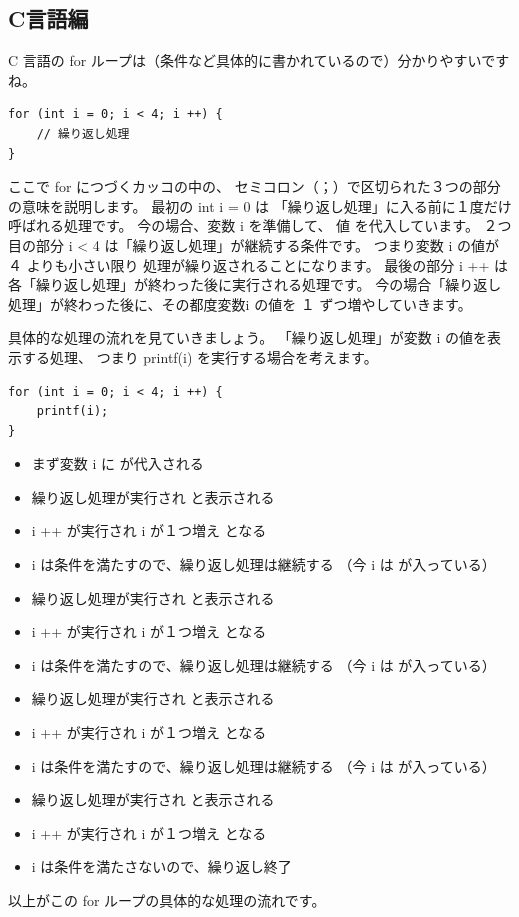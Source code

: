 \documentclass[dvipdfmx,autodetect-engine,10pt,b5paper,papersize,openany,dvipsnames]{jsbook}
\begin{document}
\begin{multicols}{2}
\section*{C言語編}
C 言語の for ループは（条件など具体的に書かれているので）分かりやすいですね。
\begin{lstlisting}
for (int i = 0; i < 4; i ++) {
    // 繰り返し処理
}
\end{lstlisting}
\noindent
ここで {\ttfamily for} につづくカッコの中の、
セミコロン（；）で区切られた３つの部分の意味を説明します。
最初の {\ttfamily int i = 0} は
「繰り返し処理」に入る前に１度だけ呼ばれる処理です。
今の場合、変数 {\ttfamily i} を準備して、
値 {} を代入しています。
２つ目の部分 {\ttfamily i < 4} は「繰り返し処理」が継続する条件です。
つまり変数 {\ttfamily i} の値が {\ttfamily ４} よりも小さい限り
処理が繰り返されることになります。
最後の部分 {\ttfamily i ++} は各「繰り返し処理」が終わった後に実行される処理です。
今の場合「繰り返し処理」が終わった後に、その都度変数{\ttfamily i}
の値を {\ttfamily １} ずつ増やしていきます。


具体的な処理の流れを見ていきましょう。
「繰り返し処理」が変数 {\ttfamily i} の値を表示する処理、
つまり {\ttfamily printf(i)} を実行する場合を考えます。
\begin{lstlisting}
for (int i = 0; i < 4; i ++) {
    printf(i);
}
\end{lstlisting}
{\small
  \begin{itemize}
  \item まず変数 {\ttfamily i} に {} が代入される
  \item 繰り返し処理が実行され  {} と表示される
  \item {\ttfamily i ++} が実行され {\ttfamily i} が１つ増え
    {} となる
  \item {\ttfamily i} は条件を満たすので、繰り返し処理は継続する
    （今 {\ttfamily i} は {} が入っている）
  \item 繰り返し処理が実行され {} と表示される
  \item {\ttfamily i ++} が実行され {\ttfamily i} が１つ増え
    {} となる
  \item {\ttfamily i} は条件を満たすので、繰り返し処理は継続する
    （今 {\ttfamily i} は {} が入っている）
  \item 繰り返し処理が実行され {} と表示される
  \item {\ttfamily i ++} が実行され {\ttfamily i} が１つ増え
    {} となる
  \item {\ttfamily i} は条件を満たすので、繰り返し処理は継続する
    （今 {\ttfamily i} は {} が入っている）
  \item 繰り返し処理が実行され {} と表示される
  \item {\ttfamily i ++} が実行され {\ttfamily i} が１つ増え
    {} となる
  \item {\ttfamily i} は条件を満たさないので、繰り返し終了
  \end{itemize}
}
以上がこの for ループの具体的な処理の流れです。


\end{multicols}
\end{document}
